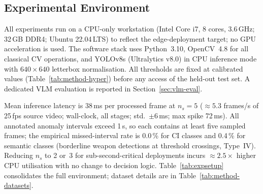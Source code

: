 \documentclass[a4paper,fleqn]{cas-dc}
\begin{document}
\FloatBarrier
\subsection{Experimental Environment}
\label{sec:expenv}
 
All experiments run on a CPU-only workstation (Intel Core i7, 8 cores, 3.6\,GHz; 32\,GB DDR4; Ubuntu 22.04\,LTS) to reflect the edge-deployment target; no GPU acceleration is used. The software stack uses Python~3.10, OpenCV~4.8 for all classical CV operations, and YOLOv8s (Ultralytics v8.0) in CPU inference mode with $640{\times}640$ letterbox normalisation. All thresholds are fixed at calibrated values (Table~\ref{tab:method-hyper}) before any access of the held-out test set. A dedicated VLM evaluation is reported in Section~\ref{sec:vlm-eval}.
 
Mean inference latency is 38\,ms per processed frame at $n_s=5$ (${\approx}5.3$ frames/s of 25\,fps source video; wall-clock, all stages; std.\ $\pm$6\,ms; max spike 72\,ms). All annotated anomaly intervals exceed 1\,s, so each contains at least five sampled frames; the empirical missed-interval rate is 0.0\,\% for CI classes and 0.4\,\% for semantic classes (borderline weapon detections at threshold crossings, Type~IV). Reducing $n_s$ to 2 or~3 for sub-second-critical deployments incurs ${\approx}2.5{\times}$ higher CPU utilisation with no change to decision logic. Table~\ref{tab:expsetup} consolidates the full environment; dataset details are in Table~\ref{tab:method-datasets}.
 
\end{document}

